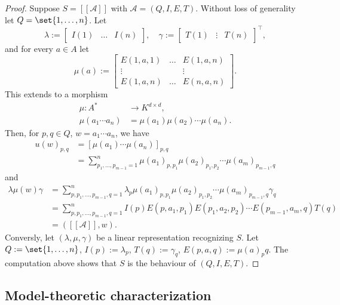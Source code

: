 \begin{proof}
    Suppose $S = [[\mathcal{A}]]$ with $\mathcal{A} = (Q, I, E, T)$. Without 
    loss of generality let $Q = \set{1, \dots, n}$. Let 
    \[
        \lambda := \begin{bmatrix}
            I(1) & \dots & I(n)
        \end{bmatrix}, \quad \gamma := \begin{bmatrix}
            T(1) & \vdots & T(n)
        \end{bmatrix}^\top,
    \]
    and for every $a \in A$ let 
    \[
        \mu(a) := \begin{bmatrix}
            E(1, a, 1) & \dots & E(1, a, n) \\
            \vdots & & \vdots \\
            E(1, a, n) & \dots & E(n, a, n)
        \end{bmatrix}.
    \]
    This extends to a morphism
    \begin{align*}
        \mu \colon A^* &\to K^{d \times d}, \\
        \mu(a_1 \cdots a_n) &= \mu(a_1)\mu(a_2) \cdots \mu(a_n).
    \end{align*}
    Then, for $p, q \in Q$, $w = a_1 \cdots a_n$, we have
    \begin{align*}
        u(w)_{p,q} &= [
            \mu(a_1) \cdots \mu(a_n)
        ]_{p,q} \\
        &= \sum_{p_1,\dots,p_{m-1} = 1}^{n} \mu(a_1)_{p,p_1}\mu(a_2)_{p_1,p_2} \cdots \mu(a_m)_{p_{m-1},q}
    \end{align*}
    and
    \begin{align*}
        \lambda \mu(w) \gamma &= \sum_{p, p_1,\dots,p_{m-1}, q = 1}^{n} \lambda_p\mu(a_1)_{p,p_1}\mu(a_2)_{p_1,p_2} \cdots \mu(a_m)_{p_{m-1},q} \gamma_q \\
        &= \sum_{p, p_1,\dots,p_{m-1}, q = 1}^{n} I(p) E(p,a_1,p_1)E(p_1,a_2,p_2) \cdots E(p_{m-1},a_m,q)T(q) \\
        &= ([[\mathcal{A}]], w).
    \end{align*}
    Conversly, let $(\lambda, \mu, \gamma)$ be a linear representation recognizing $S$. 
    Let $Q:=\set{1,\dots,n}$, $I(p) := \lambda_p$, $T(q) := \gamma_q$, 
    $E(p,a,q) := \mu(a)_pq$. The computation above shows that $S$ is the 
    behaviour of $(Q, I, E, T)$.
\end{proof}

\subsection{Model-theoretic characterization}

